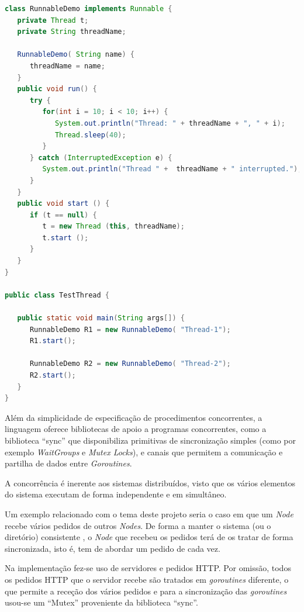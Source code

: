 
\begin{lstlisting}[caption={Exemplo em \emph{Java}, usando a \emph{interface} ``Runnable'' e uma classe``RunnableDemo'' para começar \emph{threads}.},language=Java]
class RunnableDemo implements Runnable {
   private Thread t;
   private String threadName;
   
   RunnableDemo( String name) {
      threadName = name;
   }
   public void run() {
      try {
         for(int i = 10; i < 10; i++) {
            System.out.println("Thread: " + threadName + ", " + i);
            Thread.sleep(40);
         }
      } catch (InterruptedException e) {
         System.out.println("Thread " +  threadName + " interrupted.");
      }
   }
   public void start () {
      if (t == null) {
         t = new Thread (this, threadName);
         t.start ();
      }
   }
}

public class TestThread {

   public static void main(String args[]) {
      RunnableDemo R1 = new RunnableDemo( "Thread-1");
      R1.start();
      
      RunnableDemo R2 = new RunnableDemo( "Thread-2");
      R2.start();
   }   
}

\end{lstlisting}

Além da simplicidade de especificação de procedimentos concorrentes, a linguagem oferece bibliotecas de apoio a programas concorrentes, como a biblioteca ``sync'' que disponibiliza primitivas de sincronização simples (como por exemplo \emph{WaitGroups} e \emph{Mutex Locks}), e canais que permitem a comunicação e partilha de dados entre \emph{Goroutines}.

A concorrência é inerente aos sistemas distribuídos, visto que os vários elementos do sistema executam de forma independente e em simultâneo.

Um exemplo relacionado com o tema deste projeto seria o caso em que um \emph{Node} recebe vários pedidos de outros \emph{Nodes}. De forma a manter o sistema (ou o diretório) consistente , o \emph{Node} que recebeu os pedidos terá de os tratar de forma sincronizada, isto é, tem de abordar um pedido de cada vez.

Na implementação fez-se uso de servidores e pedidos \acs{HTTP}. Por omissão, todos os pedidos \acs{HTTP} que o servidor recebe são tratados em \emph{goroutines} diferente, o que permite a receção dos vários pedidos e para a sincronização das \emph{goroutines} usou-se um ``Mutex'' proveniente da biblioteca ``sync''.

